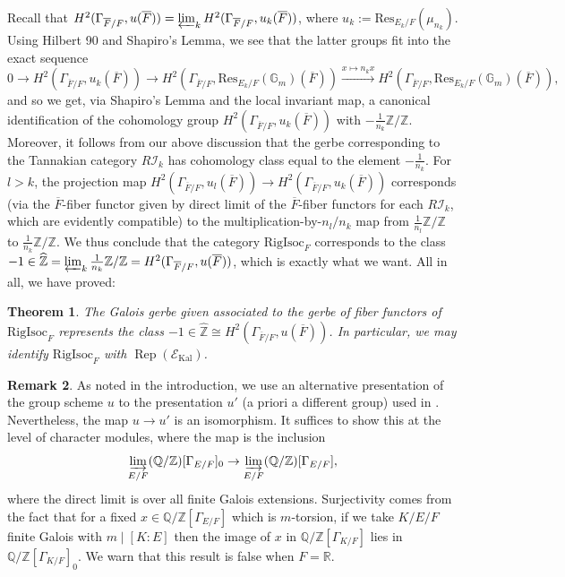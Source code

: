 \documentclass[11pt]{amsart}
\newtheorem{thm}{Theorem}[section]
\theoremstyle{definition}
\newtheorem{rem}[thm]{Remark}
\newcommand{\mc}{\mathcal}
\newcommand{\Z}{\mathbb{Z}}
\newcommand{\Q}{\mathbb{Q}}
\newcommand{\ov}{\overline}
\newcommand{\RigIsoc}{\mathrm{RigIsoc}}
\DeclareMathOperator{\Kal}{Kal}
\DeclareMathOperator{\Rep}{Rep}
\begin{document}
Recall that $H^{2}(\Gamma_{\ov{F}/F}, u(\ov{F})) = \varprojlim_{k} H^{2}(\Gamma_{\ov{F}/F}, u_{k}(\ov{F}))$, where $u_{k} := \text{Res}_{E_{k}/F}(\mu_{n_{k}})$. Using Hilbert 90 and Shapiro's Lemma, we see that the latter groups fit into the exact sequence $$0 \to H^{2}(\Gamma_{\ov{F}/F}, u_{k}(\ov{F})) \to H^{2}(\Gamma_{\ov{F}/F}, \text{Res}_{E_{k}/F}(\mathbb{G}_{m})(\ov{F})) \xrightarrow{x \mapsto n_{k}x} H^{2}(\Gamma_{\ov{F}/F}, \text{Res}_{E_{k}/F}(\mathbb{G}_{m})(\ov{F})),$$ and so we get, via Shapiro's Lemma and the local invariant map, a canonical identification of the cohomology group $H^{2}(\Gamma_{\ov{F}/F}, u_{k}(\ov{F}))$ with $-\frac{1}{n_{k}}\Z/\Z$. Moreover, it follows from our above discussion that the gerbe corresponding to the Tannakian category $R\mc{I}_{k}$ has cohomology class equal to the element $-\frac{1}{n_{k}}$. For $l > k$, the projection map $H^{2}(\Gamma_{\ov{F}/F}, u_{l}(\ov{F})) \to H^{2}(\Gamma_{\ov{F}/F}, u_{k}(\ov{F}))$ corresponds (via the $\ov{F}$-fiber functor given by direct limit of the $\ov{F}$-fiber functors for each $R\mc{I}_{k}$, which are evidently compatible) to the multiplication-by-$n_{l}/n_{k}$ map from $\frac{1}{n_{l}}\Z/\Z$ to $\frac{1}{n_{k}}\Z/\Z$. We thus conclude that the category $\RigIsoc_{F}$ corresponds to the class $-1 \in \widehat{\Z} = \varprojlim_{k} \frac{1}{n_{k}}\Z/\Z = H^{2}(\Gamma_{\ov{F}/F}, u(\ov{F}))$, which is exactly what we want. All in all, we have proved:

\begin{thm}
    The Galois gerbe given associated to the gerbe of fiber functors of $\RigIsoc_{F}$ represents the class $-1 \in \widehat{\Z} \cong H^{2}(\Gamma_{\ov{F}/F},u(\ov{F}))$. In particular, we may identify $\RigIsoc_{F}$ with $\Rep(\mc{E}_{\Kal})$.
\end{thm}

\begin{rem}{\label{rem: Kalbbandvariant}}
    As noted in the introduction, we use an alternative presentation of the group scheme $u$ to the presentation $u'$ (a priori a different group) used in \cite{Kalannals}. Nevertheless, the map $u \to u'$ is an isomorphism. It suffices to show this at the level of character modules, where the map is the inclusion
    \begin{equation*}
        \varinjlim_{E/F} (\Q/\Z)[\Gamma_{E/F}]_{0} \to \varinjlim_{E/F} (\Q/\Z)[\Gamma_{E/F}],
    \end{equation*}
    where the direct limit is over all finite Galois extensions. Surjectivity comes from the fact that for a fixed $x \in \Q/\Z[\Gamma_{E/F}]$ which is $m$-torsion, if we take $K/E/F$ finite Galois with $m \mid [K \colon E]$ then the image of $x$ in $\Q/\Z[\Gamma_{K/F}]$ lies in $\Q/\Z[\Gamma_{K/F}]_{0}$. We warn that this result is false when $F = \mathbb{R}$.
\end{rem}
\end{document}
